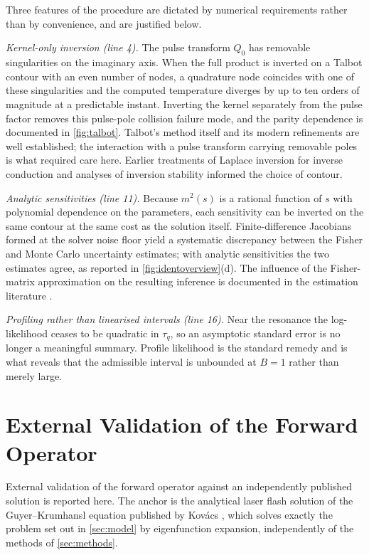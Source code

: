 \documentclass[preprint,12pt,a4paper]{elsarticle}
\theoremstyle{plain}
\theoremstyle{definition}
\theoremstyle{remark}
\newcommand{\tq}{\tau_{q}}
\newcommand{\Bnum}{B}
\begin{document}
Three features of the procedure are dictated by numerical requirements rather
than by convenience, and are justified below.

\emph{Kernel-only inversion (line 4).} The pulse transform $\hat{Q}_0$ has
removable singularities on the imaginary axis. When the full product is inverted
on a Talbot contour with an even number of nodes, a quadrature node coincides
with one of these singularities and the computed temperature diverges by up to
ten orders of magnitude at a predictable instant. Inverting the kernel separately from the pulse factor
removes this pulse-pole collision failure mode, and the parity dependence is
documented in \cref{fig:talbot}. Talbot's method itself \cite{Talbot1979} and its modern
refinements \cite{Dingfelder2014} are well established; the interaction with a
pulse transform carrying removable poles is what required care here. Earlier
treatments of Laplace inversion for inverse conduction \cite{Woo1981} and
analyses of inversion stability \cite{Kryzhniy2006,Zakian1969}
informed the choice of contour.

\emph{Analytic sensitivities (line 11).} Because $m^{2}(s)$ is a rational
function of $s$ with polynomial dependence on the parameters, each sensitivity
can be inverted on the same contour at the same cost as the solution itself.
Finite-difference Jacobians formed at the solver noise floor yield a systematic
discrepancy between the Fisher and Monte Carlo uncertainty estimates; with
analytic sensitivities the two estimates agree, as reported in
\cref{fig:identoverview}(d). The influence of the Fisher-matrix approximation
on the resulting inference is documented in the estimation literature
\cite{Stromberg2016}.

\emph{Profiling rather than linearised intervals (line 16).} Near the resonance
the log-likelihood ceases to be quadratic in $\tq$, so an asymptotic standard
error is no longer a meaningful summary. Profile likelihood is the standard
remedy \cite{Raue2009,Simpson2023} and is what reveals that the admissible
interval is unbounded at $\Bnum=1$ rather than merely large.

\section{External Validation of the Forward Operator}
\label{sec:validation}

External validation of the forward operator against an independently
published solution is reported here. The anchor is the analytical laser flash
solution of the Guyer--Krumhansl equation published by Kov\'acs
\cite{Kovacs2018}, which solves exactly the problem set out in
\cref{sec:model} by eigenfunction expansion, independently of the methods of
\cref{sec:methods}.
\end{document}
